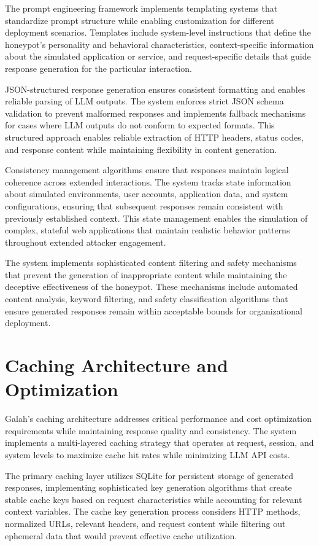 The prompt engineering framework implements templating systems that standardize prompt structure while enabling customization for different deployment scenarios. Templates include system-level instructions that define the honeypot's personality and behavioral characteristics, context-specific information about the simulated application or service, and request-specific details that guide response generation for the particular interaction.

JSON-structured response generation ensures consistent formatting and enables reliable parsing of LLM outputs. The system enforces strict JSON schema validation to prevent malformed responses and implements fallback mechanisms for cases where LLM outputs do not conform to expected formats. This structured approach enables reliable extraction of HTTP headers, status codes, and response content while maintaining flexibility in content generation.

Consistency management algorithms ensure that responses maintain logical coherence across extended interactions. The system tracks state information about simulated environments, user accounts, application data, and system configurations, ensuring that subsequent responses remain consistent with previously established context. This state management enables the simulation of complex, stateful web applications that maintain realistic behavior patterns throughout extended attacker engagement.

The system implements sophisticated content filtering and safety mechanisms that prevent the generation of inappropriate content while maintaining the deceptive effectiveness of the honeypot. These mechanisms include automated content analysis, keyword filtering, and safety classification algorithms that ensure generated responses remain within acceptable bounds for organizational deployment.

\section{Caching Architecture and Optimization}

Galah's caching architecture addresses critical performance and cost optimization requirements while maintaining response quality and consistency. The system implements a multi-layered caching strategy that operates at request, session, and system levels to maximize cache hit rates while minimizing LLM API costs.

The primary caching layer utilizes SQLite for persistent storage of generated responses, implementing sophisticated key generation algorithms that create stable cache keys based on request characteristics while accounting for relevant context variables. The cache key generation process considers HTTP methods, normalized URLs, relevant headers, and request content while filtering out ephemeral data that would prevent effective cache utilization.

